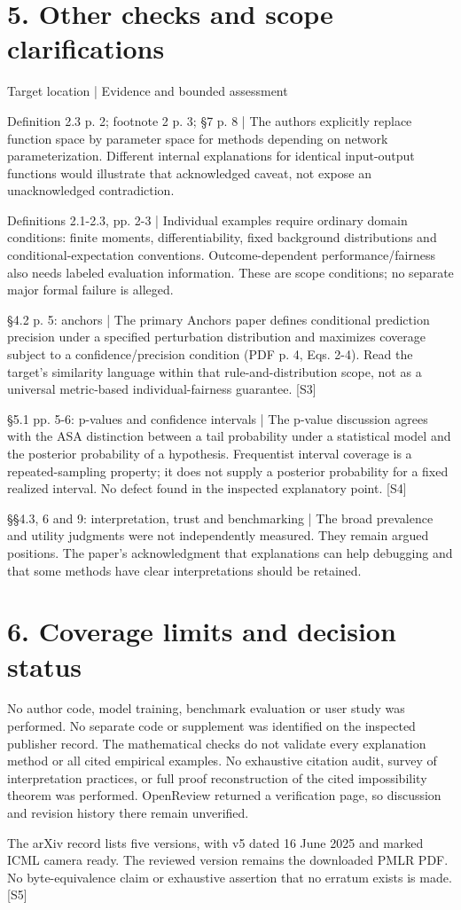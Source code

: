 \documentclass[10pt]{article}
\begin{document}
\section*{5. Other checks and scope clarifications}
Target location | Evidence and bounded assessment\par
Definition 2.3 p. 2; footnote 2 p. 3; §7 p. 8 | The authors explicitly replace function space by parameter space for methods depending on network parameterization. Different internal explanations for identical input-output functions would illustrate that acknowledged caveat, not expose an unacknowledged contradiction.\par
Definitions 2.1-2.3, pp. 2-3 | Individual examples require ordinary domain conditions: finite moments, differentiability, fixed background distributions and conditional-expectation conventions. Outcome-dependent performance/fairness also needs labeled evaluation information. These are scope conditions; no separate major formal failure is alleged.\par
§4.2 p. 5: anchors | The primary Anchors paper defines conditional prediction precision under a specified perturbation distribution and maximizes coverage subject to a confidence/precision condition (PDF p. 4, Eqs. 2-4). Read the target’s similarity language within that rule-and-distribution scope, not as a universal metric-based individual-fairness guarantee. [S3]\par
§5.1 pp. 5-6: p-values and confidence intervals | The p-value discussion agrees with the ASA distinction between a tail probability under a statistical model and the posterior probability of a hypothesis. Frequentist interval coverage is a repeated-sampling property; it does not supply a posterior probability for a fixed realized interval. No defect found in the inspected explanatory point. [S4]\par
§§4.3, 6 and 9: interpretation, trust and benchmarking | The broad prevalence and utility judgments were not independently measured. They remain argued positions. The paper’s acknowledgment that explanations can help debugging and that some methods have clear interpretations should be retained.\par
\section*{6. Coverage limits and decision status}
No author code, model training, benchmark evaluation or user study was performed. No separate code or supplement was identified on the inspected publisher record. The mathematical checks do not validate every explanation method or all cited empirical examples. No exhaustive citation audit, survey of interpretation practices, or full proof reconstruction of the cited impossibility theorem was performed. OpenReview returned a verification page, so discussion and revision history there remain unverified.\par
The arXiv record lists five versions, with v5 dated 16 June 2025 and marked ICML camera ready. The reviewed version remains the downloaded PMLR PDF. No byte-equivalence claim or exhaustive assertion that no erratum exists is made. [S5]\par
\end{document}
